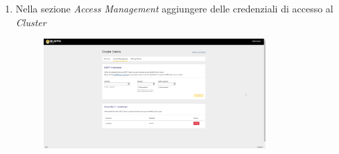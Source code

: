 \documentclass[a4paper,11pt]{article}
\begin{document}
\begin{enumerate}
      \item Nella sezione \emph{Access Management} aggiungere delle credenziali di accesso al \emph{Cluster}
        \begin{figure}[H]
          \centering
          \includegraphics[width=0.8\textwidth,height=\textheight,keepaspectratio]{assets/hivemq_access_management}
        \end{figure}

    \end{enumerate}
\clearpage

\listoffigures
{}
\end{document}
